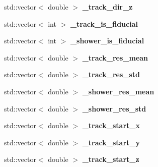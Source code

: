 \begin{DoxyCompactItemize}
\item 
\hypertarget{group__lee_ga2349ca54f697314697ff75504bbf042e}{std\-::vector$<$ double $>$ {\bfseries \-\_\-track\-\_\-dir\-\_\-z}}\label{group__lee_ga2349ca54f697314697ff75504bbf042e}

\item 
\hypertarget{group__lee_ga0c6ecffb2e944bd9842a1bbc1f6a05f1}{std\-::vector$<$ int $>$ {\bfseries \-\_\-track\-\_\-is\-\_\-fiducial}}\label{group__lee_ga0c6ecffb2e944bd9842a1bbc1f6a05f1}

\item 
\hypertarget{group__lee_ga97495f8c6c496aefe56f07f06a5a55ce}{std\-::vector$<$ int $>$ {\bfseries \-\_\-shower\-\_\-is\-\_\-fiducial}}\label{group__lee_ga97495f8c6c496aefe56f07f06a5a55ce}

\item 
\hypertarget{group__lee_gac8415acd9fe624379b1af65fe523a613}{std\-::vector$<$ double $>$ {\bfseries \-\_\-track\-\_\-res\-\_\-mean}}\label{group__lee_gac8415acd9fe624379b1af65fe523a613}

\item 
\hypertarget{group__lee_gacb00c39c2b71bd7fac4a3c7c6733d514}{std\-::vector$<$ double $>$ {\bfseries \-\_\-track\-\_\-res\-\_\-std}}\label{group__lee_gacb00c39c2b71bd7fac4a3c7c6733d514}

\item 
\hypertarget{group__lee_ga9992152dfa9af10448ef0751007d0c3a}{std\-::vector$<$ double $>$ {\bfseries \-\_\-shower\-\_\-res\-\_\-mean}}\label{group__lee_ga9992152dfa9af10448ef0751007d0c3a}

\item 
\hypertarget{group__lee_ga3a0c057fc83d09918ac2aa805d5bf3c7}{std\-::vector$<$ double $>$ {\bfseries \-\_\-shower\-\_\-res\-\_\-std}}\label{group__lee_ga3a0c057fc83d09918ac2aa805d5bf3c7}

\item 
\hypertarget{group__lee_ga1a0667bd934f598a41bb776e028270f4}{std\-::vector$<$ double $>$ {\bfseries \-\_\-track\-\_\-start\-\_\-x}}\label{group__lee_ga1a0667bd934f598a41bb776e028270f4}

\item 
\hypertarget{group__lee_ga55a26b4d446ea4597e44b2fc22de4cc6}{std\-::vector$<$ double $>$ {\bfseries \-\_\-track\-\_\-start\-\_\-y}}\label{group__lee_ga55a26b4d446ea4597e44b2fc22de4cc6}

\item 
\hypertarget{group__lee_ga71d7b5e5347441a36d0a33710d6c4483}{std\-::vector$<$ double $>$ {\bfseries \-\_\-track\-\_\-start\-\_\-z}}\label{group__lee_ga71d7b5e5347441a36d0a33710d6c4483}


\end{DoxyCompactItemize}
